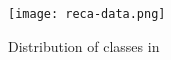 \documentclass[conference]{IEEEtran}
\begin{document}
\begin{figure}[h]
\small
 \centerline{
 \texttt{[image: reca-data.png]}}
 \caption{Distribution of classes in \cite{Recasens2013a}}
 \label{fig:recadata}
\end{figure}










\end{document}
